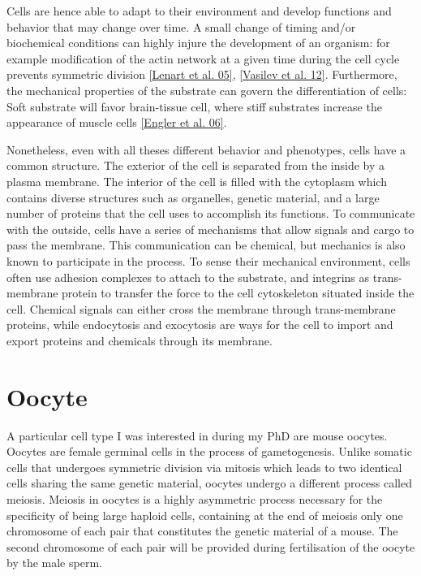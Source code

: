 \documentclass[A4paperpaper,11pt,english]{sphinxmanual}
\begin{document}
Cells are hence able to adapt to their environment and develop functions and
behavior that may change over time. A small change of timing and/or biochemical
conditions can highly injure the development of an organism: for example modification of
the actin network at a given time during the cell cycle prevents symmetric division
{\hyperref[parts/part1:lenart2005]{{[}Lenart et al. 05{]}}}, {\hyperref[parts/part1:vasilev2012]{{[}Vasilev et al. 12{]}}}. Furthermore, the mechanical properties of the substrate can
govern the differentiation of cells: Soft substrate will favor brain-tissue
cell, where stiff substrates increase the appearance of muscle cells
{\hyperref[parts/part1:engler2006]{{[}Engler et al. 06{]}}}.

Nonetheless, even with all theses different behavior and phenotypes, cells
have a common structure. The exterior of the cell is separated from the
inside by a plasma membrane. The interior of the cell is filled with the cytoplasm
which contains diverse structures such as organelles, genetic material, and
a large number of proteins that the cell uses to accomplish its functions. To
communicate with the outside, cells have a series of mechanisms that allow signals
and cargo to pass the membrane. This communication can be chemical, but
mechanics is also known to participate in the process. To sense their
mechanical environment, cells often use adhesion complexes to attach to the
substrate, and integrins as trans-membrane protein to transfer the force to the
cell cytoskeleton situated inside the cell. Chemical signals can either cross
the membrane through trans-membrane proteins, while endocytosis and exocytosis are
ways for the cell to import and export proteins and chemicals through its membrane.


\section{Oocyte}
\label{parts/part1:oocyte}
A particular cell type I was interested in during my PhD are mouse oocytes.
Oocytes are female germinal cells in the process of gametogenesis. Unlike
somatic cells that undergoes symmetric division via mitosis which leads to
two identical cells sharing the same genetic material, oocytes undergo a
different process called meiosis.  Meiosis in oocytes is a highly asymmetric
process necessary for the specificity of being large haploid
cells, containing at the end of meiosis only one chromosome of each pair
that constitutes the genetic material of a mouse. The second chromosome of each pair
will be provided during fertilisation of the oocyte by the male sperm.
\end{document}
